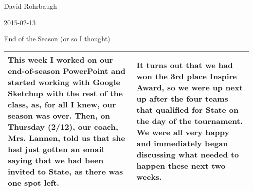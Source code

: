 David Rohrbaugh

2015-02-13

End of the Season (or so I thought)

\begin{tabular}{|p{5cm}|p{5cm}|}
 \hline
 This week I worked on our end-of-season PowerPoint and started working with Google Sketchup with the rest of the class, as, for all I knew, our season was over. Then, on Thursday (2/12), our coach, Mrs. Lannen, told us that she had just gotten an email saying that we had been invited to State, as there was one spot left.
 &
  It turns out that we had won the 3rd place Inspire Award, so we were up next up after the four teams that qualified for State on the day of the tournament. We were all very happy and immediately began discussing what needed to happen these next two weeks.
 \\
 \hline
\end{tabular}